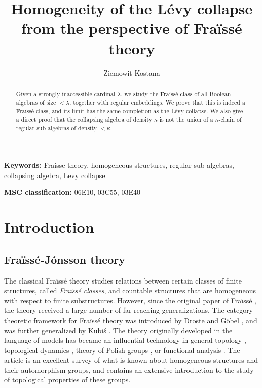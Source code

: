 \documentclass[11pt]{amsart}
\title{Homogeneity of the L\'evy collapse from the perspective of Fra\"iss\'e theory}
\author{Ziemowit Kostana}
\theoremstyle{definition}
\begin{document}
\maketitle

\begin{abstract}
Given a strongly inaccessible cardinal $\lambda$, we study the Fra\"iss\'e class of all Boolean algebras of size $<\lambda$, together with regular embeddings. We prove that this is indeed a Fra\"iss\'e class, and its limit has the same completion as the L\'evy collapse. We also give a direct proof that the collapsing algebra of density $\kappa$ is not the union of a $\kappa$-chain of regular sub-algebras of density $<\kappa$.
\end{abstract}

{\bf Keywords:} Fraisse theory, homogeneous structures, regular sub-algebras, collapsing algebra, Levy collapse 

{\bf MSC classification:} 06E10, 03C55, 03E40 

\section{Introduction}
\subsection{Fra\"iss\'e-J\'onsson theory}

The classical Fra\"iss\'e theory studies relations between certain classes of finite structures, called \emph{Fra\"iss\'e classes}, and countable structures that are homogeneous with respect to finite substructures. However, since the original paper of Fra\"iss\'e \cite{fraisse}, the theory received a large number of far-reaching generalizations. The category-theoretic framework for Fra\"iss\'e theory was introduced by Droste and G\"obel \cite{dg1} \cite{dg2}, and was further generalized by Kubi\'s \cite{kub}. The theory originally developed in the language of models has became an influential technology in general topology \cite{solecki}, topological dynamics \cite{kpt}, theory of Polish groups \cite{truss} \cite{kpt}, or functional analysis \cite{garbulinska} \cite{espana}. The article \cite{macpherson} is an excellent survey of what is known about homogeneous structures and their automorphism groups, and \cite{kechris-rosendal} contains an extensive introduction to the study of topological properties of these groups.
\end{document}
